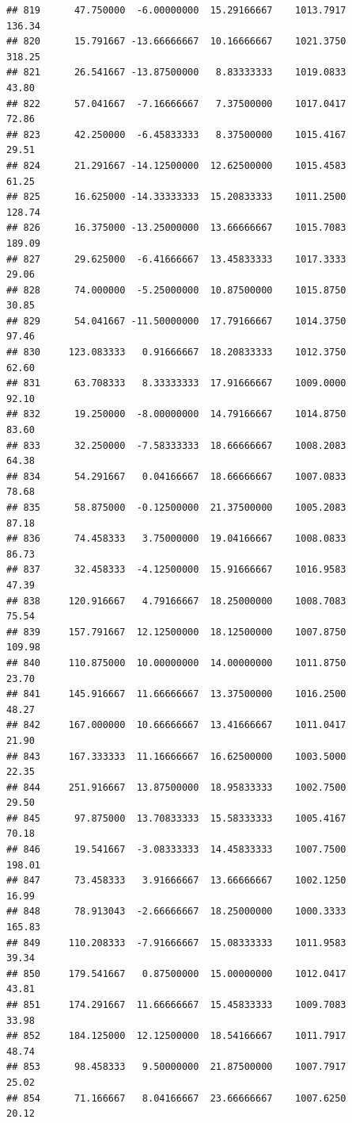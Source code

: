 \documentclass[
]{article}
\begin{document}
\begin{verbatim}
## 819      47.750000  -6.00000000  15.29166667    1013.7917      136.34
## 820      15.791667 -13.66666667  10.16666667    1021.3750      318.25
## 821      26.541667 -13.87500000   8.83333333    1019.0833       43.80
## 822      57.041667  -7.16666667   7.37500000    1017.0417       72.86
## 823      42.250000  -6.45833333   8.37500000    1015.4167       29.51
## 824      21.291667 -14.12500000  12.62500000    1015.4583       61.25
## 825      16.625000 -14.33333333  15.20833333    1011.2500      128.74
## 826      16.375000 -13.25000000  13.66666667    1015.7083      189.09
## 827      29.625000  -6.41666667  13.45833333    1017.3333       29.06
## 828      74.000000  -5.25000000  10.87500000    1015.8750       30.85
## 829      54.041667 -11.50000000  17.79166667    1014.3750       97.46
## 830     123.083333   0.91666667  18.20833333    1012.3750       62.60
## 831      63.708333   8.33333333  17.91666667    1009.0000       92.10
## 832      19.250000  -8.00000000  14.79166667    1014.8750       83.60
## 833      32.250000  -7.58333333  18.66666667    1008.2083       64.38
## 834      54.291667   0.04166667  18.66666667    1007.0833       78.68
## 835      58.875000  -0.12500000  21.37500000    1005.2083       87.18
## 836      74.458333   3.75000000  19.04166667    1008.0833       86.73
## 837      32.458333  -4.12500000  15.91666667    1016.9583       47.39
## 838     120.916667   4.79166667  18.25000000    1008.7083       75.54
## 839     157.791667  12.12500000  18.12500000    1007.8750      109.98
## 840     110.875000  10.00000000  14.00000000    1011.8750       23.70
## 841     145.916667  11.66666667  13.37500000    1016.2500       48.27
## 842     167.000000  10.66666667  13.41666667    1011.0417       21.90
## 843     167.333333  11.16666667  16.62500000    1003.5000       22.35
## 844     251.916667  13.87500000  18.95833333    1002.7500       29.50
## 845      97.875000  13.70833333  15.58333333    1005.4167       70.18
## 846      19.541667  -3.08333333  14.45833333    1007.7500      198.01
## 847      73.458333   3.91666667  13.66666667    1002.1250       16.99
## 848      78.913043  -2.66666667  18.25000000    1000.3333      165.83
## 849     110.208333  -7.91666667  15.08333333    1011.9583       39.34
## 850     179.541667   0.87500000  15.00000000    1012.0417       43.81
## 851     174.291667  11.66666667  15.45833333    1009.7083       33.98
## 852     184.125000  12.12500000  18.54166667    1011.7917       48.74
## 853      98.458333   9.50000000  21.87500000    1007.7917       25.02
## 854      71.166667   8.04166667  23.66666667    1007.6250       20.12

\end{verbatim}
\end{document}
